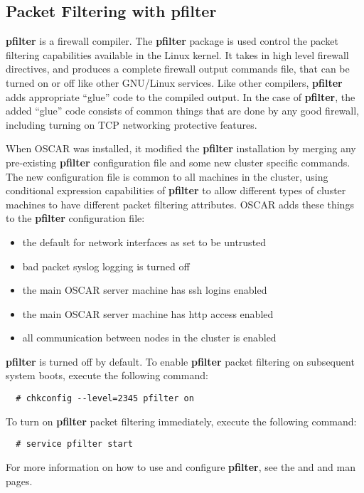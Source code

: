 %
%
%

\subsection{Packet Filtering with pfilter}
\label{app:pfilter-overview}

{\bf pfilter} is a firewall compiler.  The {\bf pfilter} package is
used control the packet filtering capabilities available in the Linux
kernel.  It takes in high level firewall directives, and produces a
complete firewall output commands file, that can be turned on or off
like other GNU/Linux services.  Like other compilers, {\bf pfilter}
adds appropriate ``glue'' code to the compiled output.  In the case of
{\bf pfilter}, the added ``glue'' code consists of common things that
are done by any good firewall, including turning on TCP networking
protective features.

When OSCAR was installed, it modified the {\bf pfilter} installation
by merging any pre-existing {\bf pfilter} configuration file and some
new cluster specific commands.  The new configuration file is common
to all machines in the cluster, using conditional expression
capabilities of {\bf pfilter} to allow different types of cluster
machines to have different packet filtering attributes.  OSCAR adds
these things to the {\bf pfilter} configuration file:

\begin{itemize}
\item the default for network interfaces as set to be untrusted
\item bad packet syslog logging is turned off
\item the main OSCAR server machine has ssh logins enabled
\item the main OSCAR server machine has http access enabled
\item all communication between nodes in the cluster is enabled
\end{itemize}

{\bf pfilter} is turned off by default. To enable {\bf pfilter} packet
filtering on subsequent system boots, execute the following command:

\begin{verbatim}
  # chkconfig --level=2345 pfilter on
\end{verbatim}

To turn on {\bf pfilter} packet filtering immediately, execute the
following command:

\begin{verbatim}
  # service pfilter start
\end{verbatim}

For more information on how to use and configure {\bf pfilter}, see
the  and  and
 man pages.

